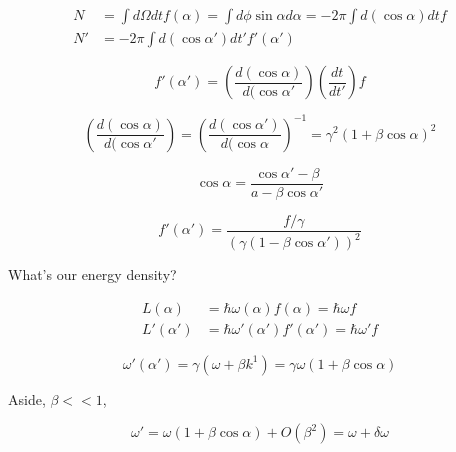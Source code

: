 \begin{align}\label{eqn:relativisticElectrodynamicsT1:160}
N &= \int d\Omega dt f(\alpha) = \int d \phi \sin \alpha d\alpha = -2 \pi \int d(\cos\alpha) dt f \\
N' &= -2 \pi \int d(\cos\alpha') dt' f'(\alpha')
\end{align}

\begin{equation}\label{eqn:relativisticElectrodynamicsT1:170}
f'(\alpha') = \left( \frac{d(\cos\alpha)}{d(\cos\alpha'} \right) \left( \frac{dt}{dt'} \right) f
\end{equation}

\begin{equation}\label{eqn:relativisticElectrodynamicsT1:180}
\left( \frac{d(\cos\alpha)}{d(\cos\alpha'} \right) = \left( \frac{d(\cos\alpha')}{d(\cos\alpha} \right)^{-1} = \gamma^2 ( 1 + \beta \cos\alpha)^2
\end{equation}

\begin{equation}\label{eqn:relativisticElectrodynamicsT1:190}
\cos\alpha = \frac{\cos\alpha' - \beta}{a - \beta \cos\alpha'}
\end{equation}

\begin{equation}\label{eqn:relativisticElectrodynamicsT1:200}
f'(\alpha') = \frac{f/\gamma}{(\gamma (1-\beta \cos\alpha'))^2}
\end{equation}

What's our energy density?

\begin{align}\label{eqn:relativisticElectrodynamicsT1:210}
L(\alpha) &= \hbar \omega(\alpha) f(\alpha) = \hbar \omega f \\
L'(\alpha') &= \hbar \omega'(\alpha') f'(\alpha') = \hbar \omega' f
\end{align}

\begin{equation}\label{eqn:relativisticElectrodynamicsT1:220}
\omega'(\alpha') = \gamma( \omega + \beta k^1 )
= \gamma \omega ( 1 + \beta \cos\alpha )
\end{equation}

Aside, $\beta << 1$, 

\begin{equation}\label{eqn:relativisticElectrodynamicsT1:230}
\omega' = \omega ( 1 + \beta \cos\alpha) + O(\beta^2) = \omega + \delta \omega
\end{equation}

